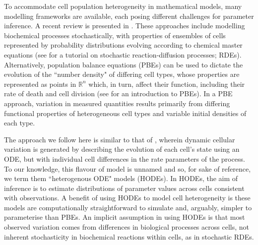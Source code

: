 To accommodate cell population heterogeneity in mathematical models, many modelling frameworks are available, each posing different challenges for parameter inference. A recent review is presented in \cite{waldherr2018estimation}. These approaches include modelling biochemical processes stochastically, with properties of ensembles of cells represented by probability distributions evolving according to chemical master equations (see \cite{erban2007practical} for a tutorial on stochastic reaction-diffusion processes; RDEs). Alternatively, population balance equations (PBEs) can be used to dictate the evolution of the ``number density" of differing cell types, whose properties are represented as points in $\mathbb{R}^n$ which, in turn, affect their function, including their rate of death and cell division (see \cite{ramkrishna2014population} for an introduction to PBEs). In a PBE approach, variation in measured quantities results primarily from differing functional properties of heterogeneous cell types and variable initial densities of each type.

The approach we follow here is similar to that of \cite{dixit2018maximum}, wherein dynamic cellular variation is generated by describing the evolution of each cell's state using an ODE, but with individual cell differences in the rate parameters of the process. To our knowledge, this flavour of model is unnamed and so, for sake of reference, we term them ``heterogenous ODE" models (HODEs). In HODEs, the aim of inference is to estimate distributions of parameter values across cells consistent with observations. A benefit of using HODEs to model cell heterogeneity is these models are computationally straightforward to simulate and, arguably, simpler to parameterise than PBEs. An implicit assumption in using HODEs is that most observed variation comes from differences in biological processes across cells, not inherent stochasticity in biochemical reactions within cells, as in stochastic RDEs.

